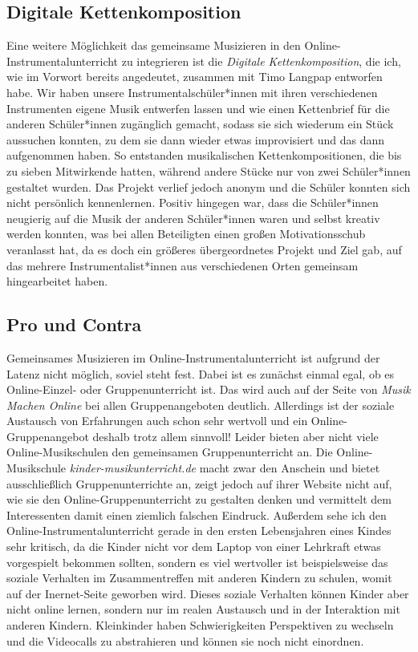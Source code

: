 \subsection{Digitale Kettenkomposition}

Eine weitere Möglichkeit das gemeinsame Musizieren in den
Online-Instrumentalunterricht zu integrieren ist die \emph{Digitale
Kettenkomposition}, die ich, wie im Vorwort bereits angedeutet, zusammen mit
Timo Langpap entworfen habe. Wir haben unsere Instrumentalschüler*innen mit
ihren verschiedenen Instrumenten eigene Musik entwerfen lassen und wie einen
Kettenbrief für die anderen Schüler*innen zugänglich gemacht, sodass sie sich
wiederum ein Stück aussuchen konnten, zu dem sie dann wieder etwas improvisiert
und das dann aufgenommen haben. So entstanden musikalischen Kettenkompositionen,
die bis zu sieben Mitwirkende hatten, während andere Stücke nur von zwei
Schüler*innen gestaltet wurden. Das Projekt verlief jedoch anonym und die
Schüler konnten sich nicht persönlich kennenlernen. Positiv hingegen war, dass
die Schüler*innen neugierig auf die Musik der anderen Schüler*innen waren und
selbst kreativ werden konnten, was bei allen Beteiligten einen großen
Motivationsschub veranlasst hat, da es doch ein größeres übergeordnetes Projekt
und Ziel gab, auf das mehrere Instrumentalist*innen aus verschiedenen Orten
gemeinsam hingearbeitet haben. 


\subsection{Pro und Contra}

Gemeinsames Musizieren im Online-Instrumentalunterricht ist aufgrund der Latenz
nicht möglich, soviel steht fest. Dabei ist es zunächst einmal egal, ob es
Online-Einzel- oder Gruppenunterricht ist. Das wird auch auf der Seite von
\emph{Musik Machen Online} bei allen Gruppenangeboten deutlich. Allerdings ist
der soziale Austausch von Erfahrungen auch schon sehr wertvoll und ein
Online-Gruppenangebot deshalb trotz allem sinnvoll! Leider bieten aber nicht
viele Online-Musikschulen den gemeinsamen Gruppenunterricht an. Die
Online-Musikschule \emph{kinder-musikunterricht.de} macht zwar den Anschein und
bietet ausschließlich Gruppenunterrichte an, zeigt jedoch auf ihrer Website
nicht auf, wie sie den Online-Gruppenunterricht zu gestalten denken und
vermittelt dem Interessenten damit einen ziemlich falschen Eindruck. Außerdem
sehe ich den Online-Instrumentalunterricht gerade in den ersten Lebensjahren
eines Kindes sehr kritisch, da die Kinder nicht vor dem Laptop von einer
Lehrkraft etwas vorgespielt bekommen sollten, sondern es viel wertvoller ist
beispielsweise das soziale Verhalten im Zusammentreffen mit anderen Kindern zu
schulen, womit auf der Inernet-Seite geworben wird. Dieses soziale Verhalten
können Kinder aber nicht online lernen, sondern nur im realen Austausch und in
der Interaktion mit anderen Kindern. Kleinkinder haben Schwierigkeiten
Perspektiven zu wechseln und die Videocalls zu abstrahieren und können sie noch
nicht einordnen.


